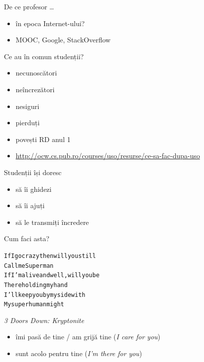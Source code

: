 \documentclass{simple}
\begin{document}
\begin{frame}{De ce profesor \ldots}
  \begin{itemize}
    \pause
    \item în epoca Internet-ului?
    \pause
    \item MOOC, Google, StackOverflow
  \end{itemize}
\end{frame}

\begin{frame}{Ce au în comun studenții?}
  \begin{itemize}
    \pause
    \item necunoscători
    \pause
    \item neîncrezători
    \pause
    \item nesiguri
    \pause
    \item pierduți
    \pause
    \item povești RD anul 1
    \pause
    \item \url{http://ocw.cs.pub.ro/courses/uso/resurse/ce-sa-fac-dupa-uso}
  \end{itemize}
\end{frame}

\begin{frame}{Studenții își doresc}
  \begin{itemize}
    \item să îi ghidezi
    \item să îi ajuți
    \item să le transmiți încredere
  \end{itemize}
\end{frame}

\begin{frame}[fragile]{Cum faci asta?}
  \begin{alltt}
If I go crazy then will you still
Call me Superman
If I'm alive and well, will you be
There holding my hand
I'll keep you by my side with
My superhuman might
  \end{alltt} \hfill \textit{3 Doors Down: Kryptonite}
  \\
  \pause
  \begin{itemize}
    \item îmi pasă de tine / am grijă tine (\textit{I care for you})
    \item sunt acolo pentru tine (\textit{I'm there for you})
  \end{itemize}
\end{frame}
\end{document}

